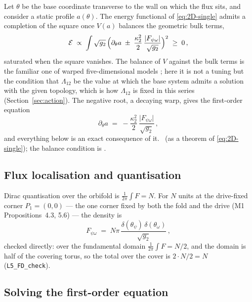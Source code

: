Let $\theta$ be the base coordinate transverse to the wall on which the
flux sits, and consider a static profile $a(\theta)$. The energy
functional of \eqref{eq:2D-single} admits a completion of the square once
$V(a)$ balances the geometric bulk terms,
\begin{equation}\label{eq:square}
  \mathcal{E}\;\propto\;\int\sqrt{g_{2}}\,
  \Bigl(\partial_{\theta}a\;\pm\;\frac{\kappa_{2}^{2}}{2}\,\frac{\lvert F_{\psi\omega}\rvert}{\sqrt{g_{2}}}\Bigr)^{2}
  \;\ge\;0\,,
\end{equation}
saturated when the square vanishes. The balance of $V$ against the bulk
terms is the familiar one of warped five-dimensional models
\cite{RS1999}; here it is not a tuning but the condition that
$\Lambda_{12}$ be the value at which the base system admits a solution
with the given topology, which is how $\Lambda_{12}$ is fixed in this
series (Section~\ref{sec:action}). The negative root, a decaying warp,
gives the first-order equation
\begin{equation}\label{eq:bps}
  \partial_{\theta}a\;=\;-\frac{\kappa_{2}^{2}}{2}\,\frac{\lvert F_{\psi\omega}\rvert}{\sqrt{g_{2}}}\,,
\end{equation}
and everything below is an exact consequence of it. \rigR\ (as a theorem of
\eqref{eq:2D-single}); the balance condition is \rigD.

\subsection{Flux localisation and quantisation}\label{sec:flux}

Dirac quantisation over the orbifold is $\frac{1}{2\pi}\int F=N$. For $N$
units at the drive-fixed corner $P_{1}=(0,0)$ --- the one corner fixed by
both the fold and the drive (M1 Propositions~4.3, 5.6) --- the density is
\begin{equation}\label{eq:flux-density}
  F_{\psi\omega}\;=\;N\pi\,\frac{\delta(\theta_{\psi})\,\delta(\theta_{\omega})}{\sqrt{g_{2}}}\,,
\end{equation}
checked directly: over the fundamental domain
$\frac{1}{2\pi}\int F=N/2$, and the domain is half of the covering torus,
so the total over the cover is $2\cdot N/2=N$ (\texttt{L5\_FD\_check}).
\rigR

\subsection{Solving the first-order equation}\label{sec:solve}

